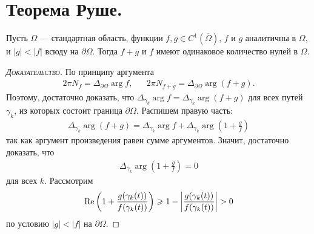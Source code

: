 \documentclass[../complex-analysis.tex]{subfiles}
\begin{document}
\newpage
\section{Теорема Руше.}

\begin{thm}[Руше]
 Пусть $ \Omega $ --- стандартная область, функции $ f,g \in C^{1}(\overline\Omega) $, $ f $ и $ g $ аналитичны в $ \Omega $, и $ \left| g \right| < \left| f \right| $ всюду на $ \partial \Omega $. Тогда $ f + g $ и $ f $ имеют одинаковое количество нулей в $ \Omega $.
\end{thm}
\begin{proof}[\normalfont\textsc{Доказательство}]
 По принципу аргумента
 \begin{align*} 2\pi N_f = \Delta_{\partial\Omega} \arg f, && 2\pi N_{f+g} = \Delta_{\partial\Omega}\arg(f+g).
 \end{align*} Поэтому, достаточно доказать, что $ \Delta_{\gamma_k} \arg f = \Delta_{\gamma_k} \arg (f+g) $ для всех путей $ \gamma_k $, из которых состоит граница $ \partial\Omega $. Распишем правую часть:
 \begin{align*}
  \Delta_{\gamma_k} \arg (f+g)  = \Delta_{\gamma_k} \arg f + \Delta_{\gamma_k} \arg \left( 1 + \frac{g}{f}\right)
 \end{align*} так как аргумент произведения равен сумме аргументов. Значит, достаточно доказать, что
 \begin{align*}
  \Delta_{\gamma_k} \arg \left( 1 + \frac{g}{f} \right) = 0
 \end{align*} для всех $ k $. Рассмотрим 
 \begin{align*}
  \operatorname{Re} \left(1 + \frac{g(\gamma_k(t))}{f(\gamma_k(t))}\right) \geqslant 1 - \left| \frac{g(\gamma_k(t))}{f(\gamma_k(t))} \right| > 0
 \end{align*} по условию $ \left| g \right| < \left| f \right|$ на $ \partial \Omega $. 


\end{proof}
\end{document}
